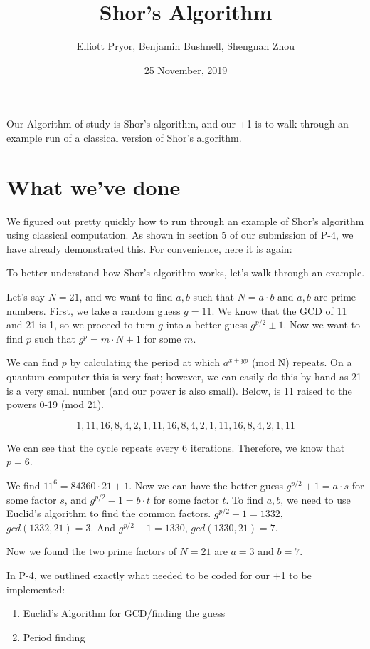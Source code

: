 \documentclass[a4paper]{article}
\title{Shor's Algorithm}
\author{Elliott Pryor, Benjamin Bushnell, Shengnan Zhou}
\date{25 November, 2019}
\begin{document}
\maketitle %

Our Algorithm of study is Shor's algorithm, and our +1 is to walk through an
example run of a classical version of Shor's algorithm.

\section{What we've done}

We figured out pretty quickly how to run through an example of Shor's algorithm
using classical computation. As shown in section 5 of our submission of P-4, we have already
demonstrated this. For convenience, here it is again:

To better understand how Shor's algorithm works, let's walk through an example.

Let's say $N=21$, and we want to find $a, b$ such that $N = a \cdot b$ and $a, b$ are prime numbers.
First, we take a random guess $g=11$. We know that the GCD of 11 and 21 is 1, so we proceed to turn $g$ into a better guess $g^{p/2} \pm 1$.
Now we want to find $p$ such that $g^p = m \cdot N + 1$ for some $m$.

We can find $p$ by calculating the period at which $a ^{x+ yp}$ (mod N) repeats. On a quantum computer this is very fast;
however, we can easily do this by hand as 21 is a very small number (and our power is also small).
Below, is 11 raised to the powers 0-19 (mod 21).

$$1, 11, 16, 8, 4, 2, 1, 11, 16, 8, 4, 2, 1, 11, 16, 8, 4, 2, 1, 11$$

We can see that the cycle repeats every 6 iterations. Therefore, we know that $p = 6$.

We find $11^ 6 = 84360 \cdot 21 + 1$. Now we can have the better guess $g^{p/2} + 1 = a \cdot s$ for some factor $s$,
and $g^{p/2} - 1 = b \cdot t$ for some factor $t$. To find $a,b$, we need to use Euclid's algorithm to find the common factors.
$g^{p/2} + 1 = 1332$, $gcd(1332, 21) = 3$. And $g^{p/2} - 1 = 1330$, $gcd(1330, 21) = 7$.

Now we found the two prime factors of $N=21$ are $a = 3$ and $b = 7$.

\hrulefill

In P-4, we outlined exactly what needed to be coded for our +1 to be implemented:
\begin{enumerate}
    \item Euclid's Algorithm for GCD/finding the guess
    \item Period finding
\end{enumerate}
\end{document}
